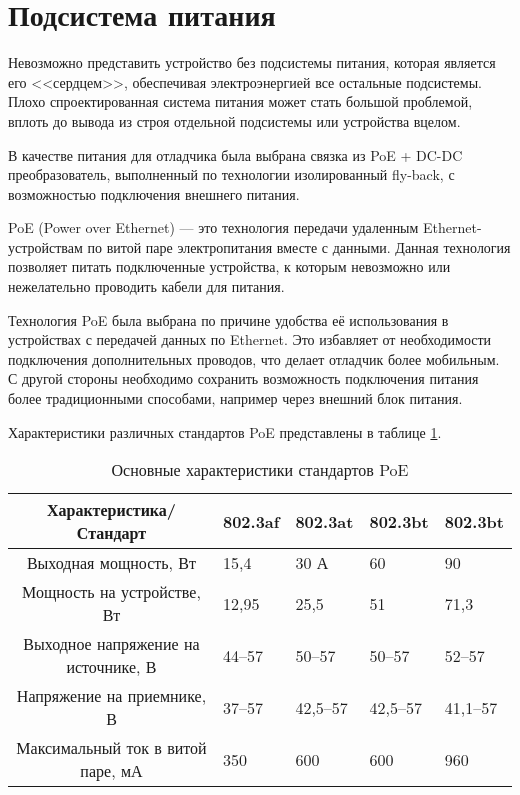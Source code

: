 \section{Подсистема питания}
\hspace{1cm} 

Невозможно представить устройство без подсистемы питания, которая является его <<сердцем>>,
обеспечивая электроэнергией все остальные подсистемы. Плохо спроектированная система питания
может стать большой проблемой, вплоть до вывода из строя отдельной подсистемы или устройства
вцелом.

В качестве питания для отладчика была выбрана связка из PoE + DC-DC преобразователь, 
выполненный по технологии изолированный fly-back, с возможностью подключения внешнего питания. 

PoE (Power over Ethernet) — это технология передачи удаленным Ethernet-устройствам по 
витой паре электропитания вместе с данными. Данная технология позволяет питать подключенные 
устройства, к которым невозможно или нежелательно проводить кабели для питания.

Технология PoE была выбрана по причине  удобства её использования в устройствах с передачей
данных по Ethernet. Это избавляет от необходимости подключения дополнительных проводов, что
делает отладчик более мобильным. С другой стороны необходимо сохранить возможность подключения
питания более традиционными способами, например через внешний блок питания.

Характеристики различных стандартов PoE представлены в таблице \ref{PoE}.

\begin{table}[H]
    \caption{Основные характеристики стандартов PoE} 
    \label{PoE}
    \begin{center}
    \begin{tabular}{|c|p{2cm}|p{2cm}|p{2cm}|p{2cm}|}
    \hline
  Характеристика/Стандарт & 802.3af  &  802.3at   & 802.3bt & 802.3bt \\ \hline
    Выходная мощность, Вт & 15,4  & 30 А & 60 &  90 \\ \hline
    Мощность на устройстве, Вт & 12,95 & 25,5 & 51 & 71,3  \\ \hline
    Выходное напряжение на источнике, В & 44--57 & 50--57 & 50--57 & 52--57 \\ \hline
    Напряжение на приемнике, В & 37--57 & 42,5--57 & 42,5--57 & 41,1--57  \\ \hline
    Максимальный ток в витой паре, мА & 350 & 600 & 600 & 960  \\ \hline
    \end{tabular}
    \end{center}
\end{table} 

